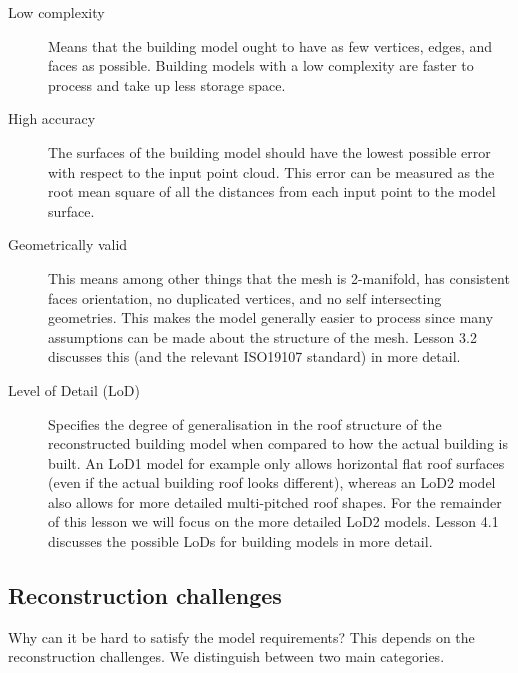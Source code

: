 \begin{description}
	\item[Low complexity] Means that the building model ought to have as few vertices, edges, and faces as possible. Building models with a low complexity are faster to process and take up less storage space.
	\item[High accuracy] The surfaces of the building model should have the lowest possible error with respect to the input point cloud. This error can be measured as the root mean square of all the distances from each input point to the model surface. 
	\item[Geometrically valid] This means among other things that the mesh is 2-manifold, has consistent faces orientation, no duplicated vertices, and no self intersecting geometries. This makes the model generally easier to process since many assumptions can be made about the structure of the mesh. Lesson 3.2 discusses this (and the relevant ISO19107 standard) in more detail.
	\item[Level of Detail (LoD)] Specifies the degree of generalisation in the roof structure of the reconstructed building model when compared to how the actual building is built. An LoD1 model for example only allows horizontal flat roof surfaces (even if the actual building roof looks different), whereas an LoD2 model also allows for more detailed multi-pitched roof shapes. For the remainder of this lesson we will focus on the more detailed LoD2 models. Lesson 4.1 discusses the possible LoDs for building models in more detail.
\end{description}

\subsection{Reconstruction challenges}
Why can it be hard to satisfy the model requirements? This depends on the reconstruction challenges. We distinguish between two main categories.


